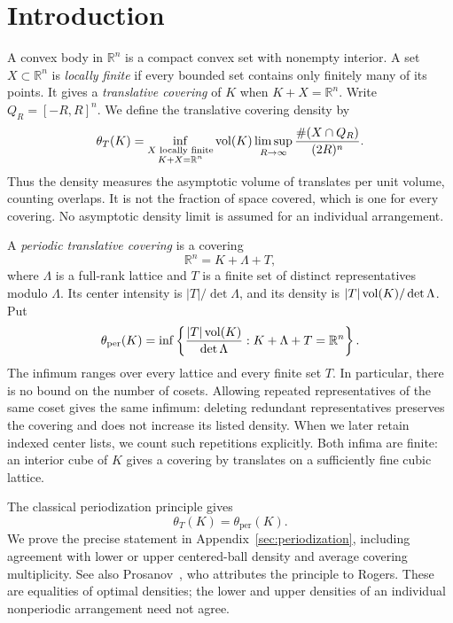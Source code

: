 \section{Introduction}

A convex body in $\mathbb R^n$ is a compact convex set with nonempty interior.
A set $X\subset\mathbb R^n$ is \emph{locally finite} if every bounded set
contains only finitely many of its points. It gives a \emph{translative
covering} of $K$ when $K+X=\mathbb R^n$. Write $Q_R=[-R,R]^n$. We define
the translative covering density by
\begin{equation}\label{eq:unrestricted-density}
 \theta_T(K)=\inf_{\substack{X\text{ locally finite}\\K+X=\mathbb R^n}}
 \operatorname{vol}(K)\limsup_{R\to\infty}
       \frac{\#(X\cap Q_R)}{(2R)^n}.
\end{equation}
Thus the density measures the asymptotic volume of translates per unit
volume, counting overlaps. It is not the fraction of space covered, which
is one for every covering. No asymptotic density limit is assumed for an
individual arrangement.

A \emph{periodic translative covering} is a covering
\[
 \mathbb R^n=K+\Lambda+T,
\]
where $\Lambda$ is a full-rank lattice and $T$ is a finite set of distinct
representatives modulo $\Lambda$. Its center intensity is
$|T|/\det\Lambda$, and its density is $|T|\operatorname{vol}(K)/\det\Lambda$. Put
\[
 \theta_{\mathrm{per}}(K)=\inf\left\{
 \frac{|T|\operatorname{vol}(K)}{\det\Lambda}:K+\Lambda+T=\mathbb R^n
 \right\}.
\]
The infimum ranges over every lattice and every finite set $T$. In particular, there is no bound on the number of cosets.
Allowing repeated representatives of the same coset gives the same
infimum: deleting redundant representatives preserves the covering and
does not increase its listed density. When we later retain indexed center
lists, we count such repetitions explicitly.
Both infima are finite: an interior cube of $K$ gives a covering by
translates on a sufficiently fine cubic lattice.

The classical periodization principle gives
\begin{equation}\label{eq:density-equivalence}
 \theta_T(K)=\theta_{\mathrm{per}}(K).
\end{equation}
We prove the precise statement in Appendix~\ref{sec:periodization},
including agreement with lower or upper centered-ball density and average
covering multiplicity. See also Prosanov~\cite[Section~1.1 and
Theorem~2.1]{Prosanov2021PackingCovering}, who attributes the principle to
Rogers. These are equalities of optimal densities; the lower and upper
densities of an individual nonperiodic arrangement need not agree.

